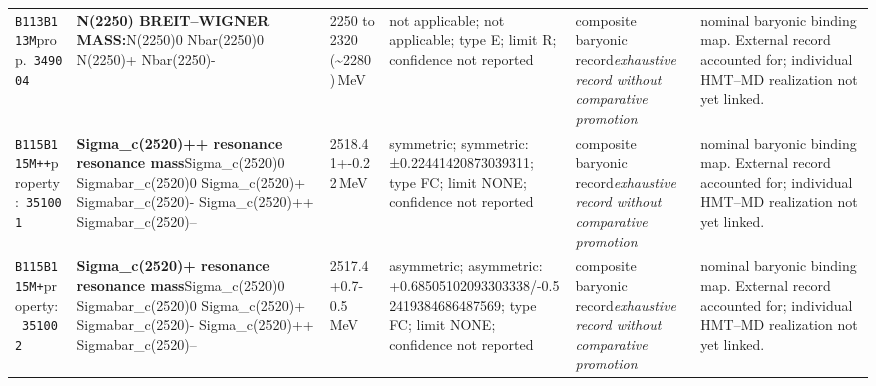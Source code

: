 \begin{landscape}
\begin{longtable}{L{1.85cm}L{4.45cm}L{2.35cm}L{4.05cm}L{3.35cm}L{7.15cm}}
\texttt{B113}\newline \texttt{B113M}\newline prop.\ \texttt{349004} & \textbf{N(2250) BREIT--WIGNER MASS:}\newline N(2250)0 \textbar{}\allowbreak{} Nbar(2250)0 \textbar{}\allowbreak{} N(2250)+ \textbar{}\allowbreak{} Nbar(2250)- & 2250 to 2320 (\textasciitilde{}2280)\,MeV & not applicable; not applicable; type E; limit R; confidence not reported & composite baryonic record\newline \emph{exhaustive record without comparative promotion} & nominal baryonic binding map. External record accounted for; individual HMT--MD realization not yet linked. \\
\texttt{B115}\newline \texttt{B115M++}\newline property:\ \texttt{351001} & \textbf{Sigma\_\allowbreak{}c(2520)++ resonance resonance mass}\newline Sigma\_\allowbreak{}c(2520)0 \textbar{}\allowbreak{} Sigmabar\_\allowbreak{}c(2520)0 \textbar{}\allowbreak{} Sigma\_\allowbreak{}c(2520)+ \textbar{}\allowbreak{} Sigmabar\_\allowbreak{}c(2520)- \textbar{}\allowbreak{} Sigma\_\allowbreak{}c(2520)++ \textbar{}\allowbreak{} Sigmabar\_\allowbreak{}c(2520)-- & 2518.41+-0.22\,MeV & symmetric; symmetric: ±0.22441420873039311; type FC; limit NONE; confidence not reported & composite baryonic record\newline \emph{exhaustive record without comparative promotion} & nominal baryonic binding map. External record accounted for; individual HMT--MD realization not yet linked. \\
\texttt{B115}\newline \texttt{B115M+}\newline property:\ \texttt{351002} & \textbf{Sigma\_\allowbreak{}c(2520)+ resonance resonance mass}\newline Sigma\_\allowbreak{}c(2520)0 \textbar{}\allowbreak{} Sigmabar\_\allowbreak{}c(2520)0 \textbar{}\allowbreak{} Sigma\_\allowbreak{}c(2520)+ \textbar{}\allowbreak{} Sigmabar\_\allowbreak{}c(2520)- \textbar{}\allowbreak{} Sigma\_\allowbreak{}c(2520)++ \textbar{}\allowbreak{} Sigmabar\_\allowbreak{}c(2520)-- & 2517.4+0.7-0.5\,MeV & asymmetric; asymmetric: +0.68505102093303338/-0.52419384686487569; type FC; limit NONE; confidence not reported & composite baryonic record\newline \emph{exhaustive record without comparative promotion} & nominal baryonic binding map. External record accounted for; individual HMT--MD realization not yet linked. \\

\end{longtable}
\end{landscape}
